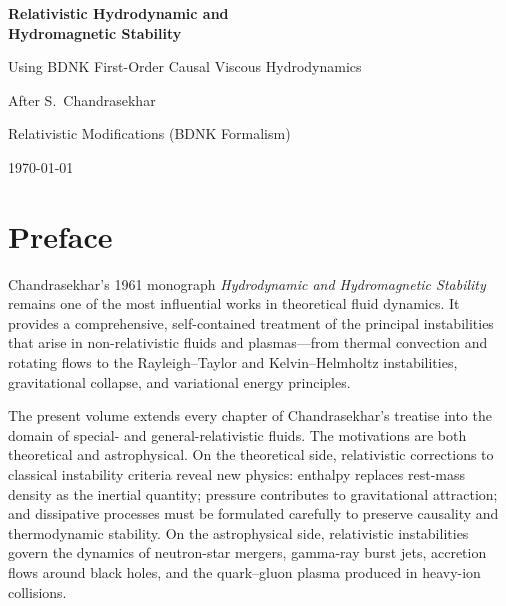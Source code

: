 \documentclass[12pt]{book}
\begin{document}
\begin{titlepage}
\centering
\vspace*{3cm}
{\Huge\bfseries Relativistic Hydrodynamic and\\[0.5em]
Hydromagnetic Stability\par}
\vspace{1.5cm}
{\Large Using BDNK First-Order Causal Viscous Hydrodynamics\par}
\vspace{2cm}
{\large After S.\ Chandrasekhar\par}
\vspace{0.5cm}
{\large Relativistic Modifications (BDNK Formalism)\par}
\vspace{3cm}
{\large \today\par}
\end{titlepage}

\frontmatter

\chapter{Preface}
\label{ch:preface}

Chandrasekhar's 1961 monograph \emph{Hydrodynamic and Hydromagnetic Stability}
remains one of the most influential works in theoretical fluid dynamics.  It
provides a comprehensive, self-contained treatment of the principal
instabilities that arise in non-relativistic fluids and plasmas---from thermal
convection and rotating flows to the Rayleigh--Taylor and Kelvin--Helmholtz
instabilities, gravitational collapse, and variational energy principles.

The present volume extends every chapter of Chandrasekhar's treatise into the
domain of special- and general-relativistic fluids.  The motivations are both
theoretical and astrophysical.  On the theoretical side, relativistic
corrections to classical instability criteria reveal new physics: enthalpy
replaces rest-mass density as the inertial quantity; pressure contributes to
gravitational attraction; and dissipative processes must be formulated
carefully to preserve causality and thermodynamic stability.  On the
astrophysical side, relativistic instabilities govern the dynamics of
neutron-star mergers, gamma-ray burst jets, accretion flows around black holes,
and the quark--gluon plasma produced in heavy-ion collisions.
\end{document}

